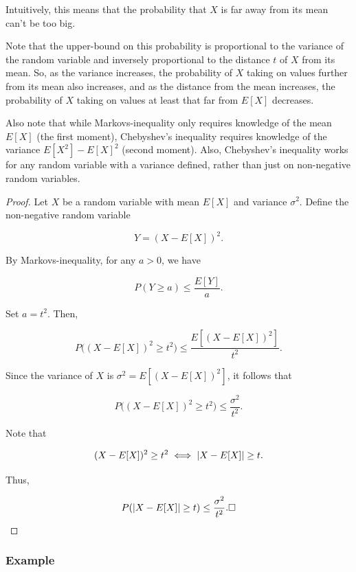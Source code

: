 \documentclass{article}
\begin{document}
\begin{note}
Intuitively, this means that the \@{probability} that $X$ is far away from its mean can't be too big.

Note that the upper-bound on this probability is proportional to the \@{variance} of the \@{random variable} and inversely proportional to the distance $t$ of $X$ from its mean. So, as the variance increases, the probability of $X$ taking on values further from its mean also increases, and as the distance from the mean increases, the probability of $X$ taking on values at least that far from $E[X]$ decreases.

Also note that while \@{Markovs-inequality} only requires knowledge of the mean $E[X]$ (the first moment), \@{Chebyshev's inequality} requires knowledge of the variance $E[X^2] - E[X]^2$ (second moment). Also, Chebyshev's inequality works for any random variable with a variance defined, rather than just on \@{non-negative} random variables.
\end{note}

\begin{proof}
Let $X$ be a \@{random variable} with mean $E[X]$ and \@{variance} $\sigma^2$. Define the \@{non-negative} random variable

\[ Y = (X - E[X])^2. \]

By \@{Markovs-inequality}, for any $a > 0$, we have

\[ P(Y \ge a) \le \frac{E[Y]}{a}. \]

Set $a = t^2$. Then,

\[ P\big((X - E[X])^2 \ge t^2\big) \le \frac{E[(X - E[X])^2]}{t^2}. \]

Since the variance of $X$ is $\sigma^2 = E[(X - E[X])^2]$, it follows that

\[ P\big((X - E[X])^2 \ge t^2\big) \le \frac{\sigma^2}{t^2}. \]

Note that

\[ (X - E[X])^2 \ge t^2 \iff \left| X - E[X] \right| \ge t. \]

Thus,

\[ P(\left| X - E[X] \right| \ge t) \le \frac{\sigma^2}{t^2}. \square \]
\end{proof}

\subsubsection{Example}
\end{document}
